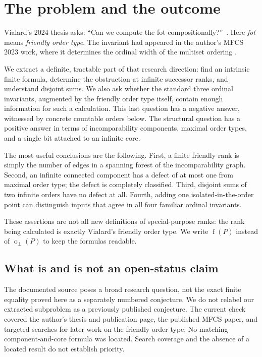 \documentclass[11pt,a4paper]{article}
\theoremstyle{definition}
\theoremstyle{remark}
\DeclareMathOperator{\mot}{o}
\DeclareMathOperator{\fot}{f}
\begin{document}
\section{The problem and the outcome}\label{sec:problem}

Vialard's 2024 thesis asks: ``Can we compute the fot compositionally?''\
\cite[p.~109]{Vialard2024}. Here \emph{fot} means
\emph{friendly order type}. The invariant had appeared in the author's MFCS
2023 work, where it determines the ordinal width of the multiset ordering
\cite[Theorem~3.4]{Vialard2023}.

We extract a definite, tractable part of that research direction: find an
intrinsic finite formula, determine the obstruction at infinite successor
ranks, and understand disjoint sums. We also ask whether the standard three
ordinal invariants, augmented by the friendly order type itself, contain
enough information for such a calculation. This last question has a negative
answer, witnessed by concrete countable orders below. The structural question
has a positive answer in terms of incomparability components, maximal order
types, and a single bit attached to an infinite core.

The most useful conclusions are the following. First, a finite friendly rank
is simply the number of edges in a spanning forest of the incomparability
graph. Second, an infinite connected component has a defect of at most one
from maximal order type; the defect is completely classified. Third,
disjoint sums of two infinite orders have no defect at all. Fourth, adding
one isolated-in-the-order point can distinguish inputs that agree in all
four familiar ordinal invariants.

These assertions are not all new definitions of special-purpose ranks: the
rank being calculated is exactly Vialard's friendly order type. We write
$\fot(P)$ instead of $\mot_{\perp}(P)$ to keep the formulas readable.

\subsection{What is and is not an open-status claim}

The documented source poses a broad research question, not the exact finite
equality proved here as a separately numbered conjecture. We do not relabel
our extracted subproblem as a previously published conjecture. The current
check covered the author's thesis and publication page, the published MFCS
paper, and targeted searches for later work on the friendly order type. No
matching component-and-core formula was located. Search coverage and the
absence of a located result do not establish priority.
\end{document}
